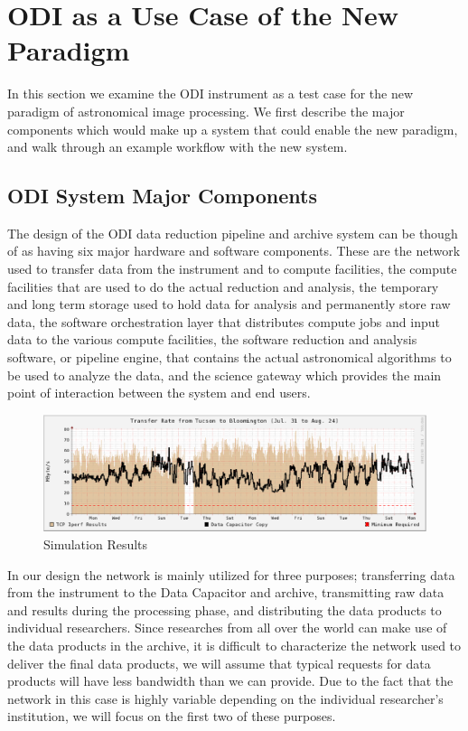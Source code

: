 \documentclass[10pt,conference]{IEEEtran}
\begin{document}
\section{ODI as a Use Case of the New Paradigm}\label{sec:ODI}

In this section we examine the ODI instrument as a test case for the new paradigm of astronomical image processing. We first describe the major components which would make up a system that could enable the new paradigm, and walk through an example workflow with the new system. 

\subsection{ODI System Major Components}\label{sec:components}

The design of the ODI data reduction pipeline and archive system can be though of as having six major hardware and software components. These are the network used to transfer data from the instrument and to compute facilities, the compute facilities that are used to do the actual reduction and analysis, the temporary and long term storage used to hold data for analysis and permanently store raw data, the software orchestration layer that distributes compute jobs and input data to the various compute facilities, the software reduction and analysis software, or pipeline engine, that contains the actual astronomical algorithms to be used to analyze the data, and the science gateway which provides the main point of interaction between the system and end users.   

\begin{figure}[t]
\centering
\includegraphics[width=6in]{network_throughput.eps}
\caption{Simulation Results}
\label{fig:network}
\end{figure}

In our design the network is mainly utilized for three purposes; transferring data from the instrument to the Data Capacitor and archive, transmitting raw data and results during the processing phase, and distributing the data products to individual researchers. Since researches from all over the world can make use of the data products in the archive, it is difficult to characterize the network used to deliver the final data products, we will assume that typical requests for data products will have less bandwidth than we can provide. Due to the fact that the network in this case is highly variable depending on the individual researcher's institution, we will focus on the first two of these purposes. 
\end{document}
